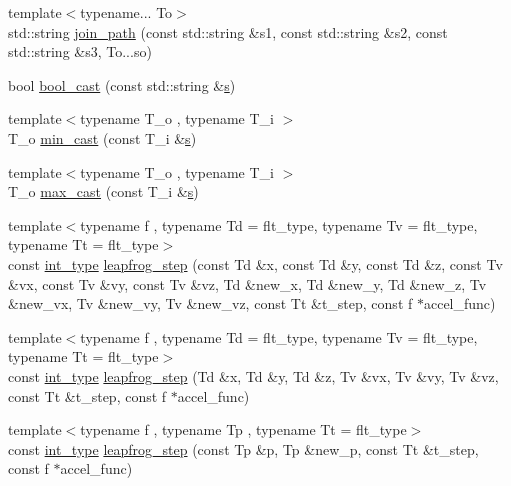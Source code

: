 \begin{DoxyCompactItemize}
\item 
{\footnotesize template$<$typename... To$>$ }\\std\+::string \hyperlink{namespaceIceBRG_aa0859ec40cf4e02d03a53f29b939a676}{join\+\_\+path} (const std\+::string \&s1, const std\+::string \&s2, const std\+::string \&s3, To...\+so)
\item 
bool \hyperlink{namespaceIceBRG_ab1e55cf51f919239eb88b3d4e6a2d2d9}{bool\+\_\+cast} (const std\+::string \&\hyperlink{namespaceIceBRG_ad0b9ada1ad5ccc9d88c2050483109e06}{s})
\item 
{\footnotesize template$<$typename T\+\_\+o , typename T\+\_\+i $>$ }\\T\+\_\+o \hyperlink{namespaceIceBRG_a7808efd6744cf133cf249120e8df5cb5}{min\+\_\+cast} (const T\+\_\+i \&\hyperlink{namespaceIceBRG_ad0b9ada1ad5ccc9d88c2050483109e06}{s})
\item 
{\footnotesize template$<$typename T\+\_\+o , typename T\+\_\+i $>$ }\\T\+\_\+o \hyperlink{namespaceIceBRG_a27981cf15a5a2520505203f61a5bf4b3}{max\+\_\+cast} (const T\+\_\+i \&\hyperlink{namespaceIceBRG_ad0b9ada1ad5ccc9d88c2050483109e06}{s})
\item 
{\footnotesize template$<$typename f , typename Td  = flt\+\_\+type, typename Tv  = flt\+\_\+type, typename Tt  = flt\+\_\+type$>$ }\\const \hyperlink{lib_2IceBRG__main_2common_8h_ac4de9d9335536ac22821171deec8d39e}{int\+\_\+type} \hyperlink{namespaceIceBRG_afdc416d05295db2480bc85842942cf27}{leapfrog\+\_\+step} (const Td \&x, const Td \&y, const Td \&z, const Tv \&vx, const Tv \&vy, const Tv \&vz, Td \&new\+\_\+x, Td \&new\+\_\+y, Td \&new\+\_\+z, Tv \&new\+\_\+vx, Tv \&new\+\_\+vy, Tv \&new\+\_\+vz, const Tt \&t\+\_\+step, const f $\ast$accel\+\_\+func)
\item 
{\footnotesize template$<$typename f , typename Td  = flt\+\_\+type, typename Tv  = flt\+\_\+type, typename Tt  = flt\+\_\+type$>$ }\\const \hyperlink{lib_2IceBRG__main_2common_8h_ac4de9d9335536ac22821171deec8d39e}{int\+\_\+type} \hyperlink{namespaceIceBRG_a0e0b347c2e0c02cb1558169ebfcf74b8}{leapfrog\+\_\+step} (Td \&x, Td \&y, Td \&z, Tv \&vx, Tv \&vy, Tv \&vz, const Tt \&t\+\_\+step, const f $\ast$accel\+\_\+func)
\item 
{\footnotesize template$<$typename f , typename Tp , typename Tt  = flt\+\_\+type$>$ }\\const \hyperlink{lib_2IceBRG__main_2common_8h_ac4de9d9335536ac22821171deec8d39e}{int\+\_\+type} \hyperlink{namespaceIceBRG_a67327eb98e2cdb7f17d7c84bf9f200da}{leapfrog\+\_\+step} (const Tp \&p, Tp \&new\+\_\+p, const Tt \&t\+\_\+step, const f $\ast$accel\+\_\+func)

\end{DoxyCompactItemize}

